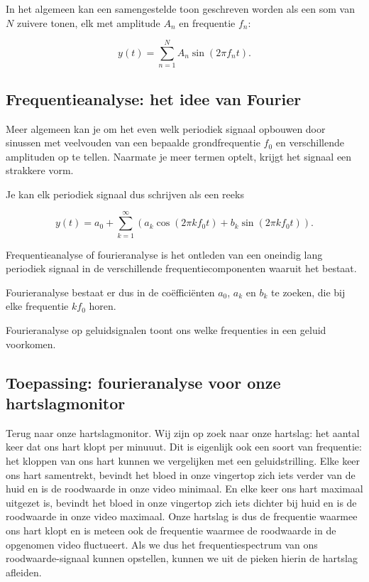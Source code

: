 In het algemeen kan een samengestelde toon geschreven worden als een som van $N$ zuivere tonen, elk met amplitude $A_n$ en frequentie $f_n$:

\begin{equation*}
y(t) = \sum_{n=1}^{N} A_n \sin(2 \pi f_n t).
\end{equation*}

\subsection{Frequentieanalyse: het idee van Fourier}

Meer algemeen kan je om het even welk periodiek signaal opbouwen door sinussen met veelvouden van een bepaalde grondfrequentie $f_0$ en verschillende amplituden op te tellen. Naarmate je meer termen optelt, krijgt het signaal een strakkere vorm.

Je kan elk periodiek signaal dus schrijven als een reeks

\begin{equation*}
y(t) = a_0 + \sum_{k=1}^{\infty} (a_k \cos(2 \pi k f_0 t) + b_k \sin(2 \pi k f_0 t)).
\end{equation*}

Frequentieanalyse of fourieranalyse is het ontleden van een oneindig lang periodiek signaal in de verschillende frequentiecomponenten waaruit het bestaat. 

Fourieranalyse bestaat er dus in de co\"effici\"enten $a_0$, $a_k$ en $b_k$ te zoeken, die bij elke frequentie $k f_0$ horen.


Fourieranalyse op geluidsignalen toont ons welke frequenties in een geluid voorkomen.

\subsection{Toepassing: fourieranalyse voor onze hartslagmonitor}

Terug naar onze hartslagmonitor. Wij zijn op zoek naar onze hartslag: het aantal keer dat ons hart klopt per minuuut. Dit is eigenlijk ook een soort van frequentie: het kloppen van ons hart kunnen we vergelijken met een geluidstrilling. Elke keer ons hart samentrekt, bevindt het bloed in onze vingertop zich iets verder van de huid en is de roodwaarde in onze video minimaal. En elke keer ons hart maximaal uitgezet is, bevindt het bloed in onze vingertop zich iets dichter bij huid en is de roodwaarde in onze video maximaal. Onze hartslag is dus de frequentie waarmee ons hart klopt en is meteen ook de frequentie waarmee de roodwaarde in de opgenomen video fluctueert. Als we dus het frequentiespectrum van ons roodwaarde-signaal kunnen opstellen, kunnen we uit de pieken hierin de hartslag afleiden.

